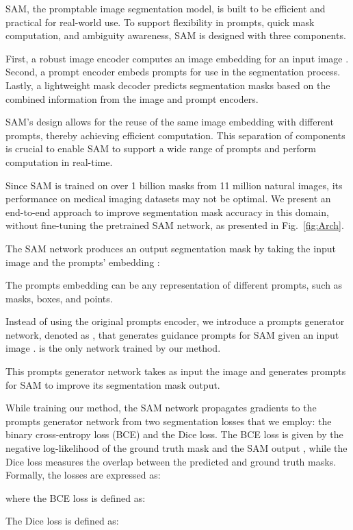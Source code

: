 \documentclass[runningheads]{llncs}
\begin{document}
SAM, the promptable image segmentation model, is built to be efficient and practical for real-world use. To support flexibility in prompts, quick mask computation, and ambiguity awareness, SAM is designed with three components.

First, a robust image encoder  computes an image embedding for an input image . Second, a prompt encoder  embeds prompts for use in the segmentation process. Lastly, a lightweight mask decoder  predicts segmentation masks based on the combined information from the image and prompt encoders.

SAM's design allows for the reuse of the same image embedding with different prompts, thereby achieving efficient computation. This separation of components is crucial to enable SAM to support a wide range of prompts and perform computation in real-time.

Since SAM is trained on over 1 billion masks from 11 million natural images, its performance on medical imaging datasets may not be optimal. We present an end-to-end approach to improve segmentation mask accuracy in this domain, without fine-tuning the pretrained SAM network, as presented in Fig.~\ref{fig:Arch}.

The SAM network  produces an output segmentation mask  by taking the input image  and the prompts' embedding :


The prompts embedding  can be any representation of different prompts, such as masks, boxes, and points.

Instead of using the original prompts encoder, we introduce a prompts generator network, denoted as , that generates guidance prompts  for SAM given an input image .  is the only network trained by our method.



This prompts generator network  takes as input the image  and generates prompts  for SAM to improve its segmentation mask output.

While training our method, the SAM network  propagates gradients to the prompts generator network  from two segmentation losses that we employ: the binary cross-entropy loss (BCE) and the Dice loss.  The BCE loss is given by the negative log-likelihood of the ground truth mask  and the SAM output , while the Dice loss measures the overlap between the predicted and ground truth masks. Formally, the losses are expressed as:


where the BCE loss is defined as:


The Dice loss is defined as:
\end{document}
